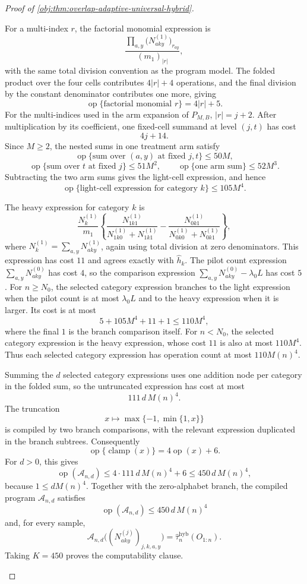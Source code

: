 \begin{proof}[Proof of \cref{obj:thm:overlap-adaptive-universal-hybrid}]
\begin{enumerate}
For a multi-index \(r\), the factorial monomial expression is
\[
\frac{\prod_{a,y}\bigl(N^{(1)}_{aky}\bigr)_{r_{ay}}}
     {(m_1)_{|r|}},
\]
with the same total division convention as the program model.  The folded product over the four cells contributes \(4|r|+4\) operations, and the final division by the constant denominator contributes one more, giving
\[
\operatorname{op}\{\text{factorial monomial }r\}=4|r|+5.
\]
For the multi-indices used in the arm expansion of \(P_{M,B}\), \(|r|=j+2\).  After multiplication by its coefficient, one fixed-cell summand at level \((j,t)\) has cost
\[
4j+14.
\]
Since \(M\ge2\), the nested sums in one treatment arm satisfy
\[
\operatorname{op}\{\text{sum over }(a,y)\text{ at fixed }j,t\}
\le 50M,
\]
\[
\operatorname{op}\{\text{sum over }t\text{ at fixed }j\}
\le 51M^2,
\qquad
\operatorname{op}\{\text{one arm sum}\}
\le 52M^3.
\]
Subtracting the two arm sums gives the light-cell expression, and hence
\[
\operatorname{op}\{\text{light-cell expression for category }k\}
\le 105M^4.
\]

The heavy expression for category \(k\) is
\[
\frac{N_k^{(1)}}{m_1}
\left\{
\frac{N^{(1)}_{1k1}}{N^{(1)}_{1k0}+N^{(1)}_{1k1}}
-
\frac{N^{(1)}_{0k1}}{N^{(1)}_{0k0}+N^{(1)}_{0k1}}
\right\},
\]
where \(N_k^{(1)}=\sum_{a,y}N^{(1)}_{aky}\), again using total division at zero denominators.  This expression has cost \(11\) and agrees exactly with \(\widehat h_k\).  The pilot count expression \(\sum_{a,y}N^{(0)}_{aky}\) has cost \(4\), so the comparison expression \(\sum_{a,y}N^{(0)}_{aky}-\lambda_0L\) has cost \(5\).  For \(n\ge N_0\), the selected category expression branches to the light expression when the pilot count is at most \(\lambda_0L\) and to the heavy expression when it is larger.  Its cost is at most
\[
5+105M^4+11+1\le 110M^4,
\]
where the final \(1\) is the branch comparison itself.  For \(n<N_0\), the selected category expression is the heavy expression, whose cost \(11\) is also at most \(110M^4\).  Thus each selected category expression has operation count at most \(110M(n)^4\).

Summing the \(d\) selected category expressions uses one addition node per category in the folded sum, so the untruncated expression has cost at most
\[
111\,d\,M(n)^4.
\]
The truncation
\[
x\longmapsto \max\{-1,\min\{1,x\}\}
\]
is compiled by two branch comparisons, with the relevant expression duplicated in the branch subtrees.  Consequently
\[
\operatorname{op}\{\operatorname{clamp}(x)\}
=4\operatorname{op}(x)+6.
\]
For \(d>0\), this gives
\[
\operatorname{op}(\mathcal A_{n,d})
\le 4\cdot 111\,d\,M(n)^4+6
\le 450\,d\,M(n)^4,
\]
because \(1\le dM(n)^4\).  Together with the zero-alphabet branch, the compiled program \(\mathcal A_{n,d}\) satisfies
\[
\operatorname{op}(\mathcal A_{n,d})
\le 450\,d\,M(n)^4
\]
and, for every sample,
\[
\mathcal A_{n,d}\bigl((N^{(j)}_{aky})_{j,k,a,y}\bigr)
=
\widehat\tau_n^{\mathrm{hyb}}(O_{1:n}).
\]
Taking \(K=450\) proves the computability clause.


\end{enumerate}
\end{proof}
